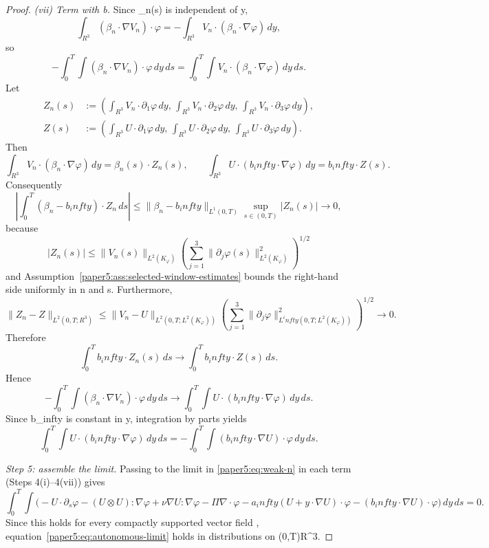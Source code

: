 \documentclass[11pt]{amsart}
\def\({}%
\def\){}%
\def\mathbb#1{#1}%
\def\infty{infty}%
\theoremstyle{plain}
\theoremstyle{definition}
\theoremstyle{remark}
\begin{document}
\begin{proof}
\medskip
\noindent\textit{(vii) Term with \(b\).}
Since \(\beta_n(s)\) is independent of \(y\),
\[
  \int_{\mathbb R^3}(\beta_n\cdot\nabla V_n)\cdot\varphi
  =-\int_{\mathbb R^3}V_n\cdot(\beta_n\cdot\nabla\varphi)
  \,dy,
\]
so
\[
  -\int_0^T\!\int(\beta_n\cdot\nabla V_n)\cdot\varphi
  \,dy\,ds
  =
  \int_0^T\!\int V_n\cdot(\beta_n\cdot\nabla\varphi)
  \,dy\,ds.
\]
Let
\[
\begin{aligned}
Z_n(s)&:=\left(\int_{\mathbb R^3}V_n\cdot\partial_1\varphi\,dy,\,
\int_{\mathbb R^3}V_n\cdot\partial_2\varphi\,dy,\,
\int_{\mathbb R^3}V_n\cdot\partial_3\varphi\,dy\right),\\
Z(s)&:=\left(\int_{\mathbb R^3}U\cdot\partial_1\varphi\,dy,\,
\int_{\mathbb R^3}U\cdot\partial_2\varphi\,dy,\,
\int_{\mathbb R^3}U\cdot\partial_3\varphi\,dy\right).
\end{aligned}
\]
Then
\[
  \int_{\mathbb R^3}V_n\cdot(\beta_n\cdot\nabla\varphi)\,dy
  =\beta_n(s)\cdot Z_n(s),\qquad
  \int_{\mathbb R^3}U\cdot(b_\infty\cdot\nabla\varphi)\,dy
  =b_\infty\cdot Z(s).
\]
Consequently
\[
  \left|\int_0^T\!(\beta_n-b_\infty)\cdot Z_n\,ds\right|
  \le
  \|\beta_n-b_\infty\|_{L^1(0,T)}\sup_{s\in(0,T)}|Z_n(s)|\to0,
\]
because
\[
  |Z_n(s)|\le
  \|V_n(s)\|_{L^2(K_\varphi)}
  \left(\sum_{j=1}^3\|\partial_j\varphi(s)\|_{L^2(K_\varphi)}^2\right)^{1/2}
\]
and Assumption~\ref{paper5:ass:selected-window-estimates} bounds the right-hand side
uniformly in \(n\) and \(s\). Furthermore,
\[
  \|Z_n-Z\|_{L^2(0,T;\mathbb R^3)}
  \le
  \|V_n-U\|_{L^2(0,T;L^2(K_\varphi))}
  \left(\sum_{j=1}^3\|\partial_j\varphi\|_{L^\infty(0,T;L^2(K_\varphi))}^2\right)^{1/2}
  \to0.
\]
Therefore
\[
  \int_0^T b_\infty\cdot Z_n(s)\,ds
  \to
  \int_0^T b_\infty\cdot Z(s)\,ds.
\]
Hence
\[
  -\int_0^T\!\int (\beta_n\cdot\nabla V_n)\cdot\varphi
  \,dy\,ds
  \to
  \int_0^T\!\int U\cdot(b_\infty\cdot\nabla\varphi)
  \,dy\,ds.
\]
Since \(b_\infty\) is constant in \(y\), integration by parts yields
\[
  \int_0^T\!\int U\cdot(b_\infty\cdot\nabla\varphi)
  \,dy\,ds
  =
  -\int_0^T\!\int (b_\infty\cdot\nabla U)\cdot\varphi
  \,dy\,ds.
\]

\emph{Step 5: assemble the limit.}
Passing to the limit in \eqref{paper5:eq:weak-n} in each term (Steps 4(i)--4(vii)) gives
\[
  \int_0^T\!\int
  \bigl(
  -U\cdot\partial_s\varphi
  -(U\otimes U):\nabla\varphi
  +\nu\nabla U:\nabla\varphi
  -\Pi\nabla\cdot\varphi
  -a_\infty(U+y\cdot\nabla U)\cdot\varphi
  -(b_\infty\cdot\nabla U)\cdot\varphi
  \bigr)
  \,dy\,ds=0.
\]
Since this holds for every compactly supported vector field \(\varphi\), equation~\eqref{paper5:eq:autonomous-limit} holds in distributions on
\((0,T)\times\mathbb R^3\).
\end{proof}
\end{document}
